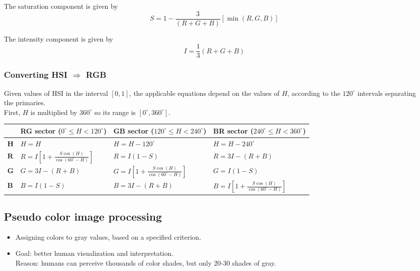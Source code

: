 The saturation component is given by
\begin{equation}
	S = 1 - \frac{3}{(R+G+B)} \left[ \min(R,G,B) \right]
\end{equation}

The intensity component is given by
\begin{equation}
	I = \frac{1}{3}(R+G+B)
\end{equation}

\subsubsection{Converting HSI $\Rightarrow$ RGB }
Given values of HSI in the interval $[0,1]$, the applicable equations depend on the values of $H$, according to the $120^{\circ}$ intervals separating the primaries.\\

First, $H$ is multiplied by $360^{\circ}$ so its range is $[0^{\circ},360^{\circ}]$. \\

\begin{tabularx}{\linewidth}{|l|X|X|X|}
	\hline 
	& \textbf{RG sector} ($0^{\circ} \leq H < 120^{\circ}$) & \textbf{GB sector} ($120^{\circ} \leq H < 240^{\circ}$) & \textbf{BR sector} ($240^{\circ} \leq H < 360^{\circ}$) \\ \hline
	$\mathbf{H}$ & $H = H$ & $H = H-120^{\circ}$ & $H = H-240^{\circ}$ \\ \hline
	$\mathbf{R}$ & $R = I \left[ 1 + \frac{S \cos(H)}{\cos(60^{\circ} - H)} \right]$ & $R = I(1-S)$ & $R = 3I - (R+B)$ \\
	$\mathbf{G}$ & $G = 3I - (R+B)$ & $G = I \left[ 1 + \frac{S \cos(H)}{\cos(60^{\circ} - H)} \right]$ & $G = I(1-S)$ \\
	$\mathbf{B}$ & $B = I(1-S)$ & $B = 3I - (R+B)$ & $B = I \left[ 1 + \frac{S \cos(H)}{\cos(60^{\circ} - H)} \right]$ \\
	\hline
\end{tabularx}


\subsection{Pseudo color image processing }
\begin{itemize}
	\item Assigning colors to gray values, based on a specified criterion.
	\item Goal: better human visualization and interpretation. \\
			Reason: humans can perceive thousands of color shades, but only 20-30 shades of gray.
\end{itemize}

